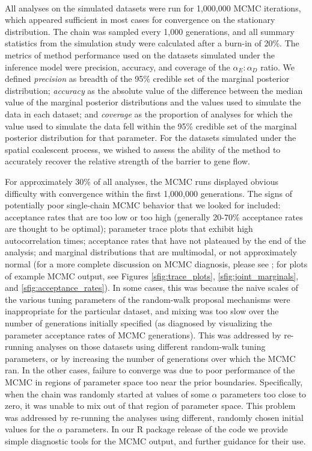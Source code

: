 \paragraph{}
All analyses on the simulated datasets were run for 1,000,000 MCMC iterations, which appeared sufficient in most cases for convergence on the stationary distribution.  The chain was sampled every 1,000 generations, and all summary statistics from the simulation study were calculated after a burn-in of 20\%.  The metrics of method performance used on the datasets simulated under the inference model were precision, accuracy, and coverage of the $\alpha_{E}:\alpha_{D}$ ratio.  We defined \emph{precision} as breadth of the 95\% credible set of the marginal posterior distribution; \emph{accuracy} as the absolute value of the difference between the median value of the marginal posterior distributions and the values used to simulate the data in each dataset; and \emph{coverage} as the proportion of analyses for which the value used to simulate the data fell within the 95\% credible set of the marginal posterior distribution for that parameter.  For the datasets simulated under the spatial coalescent process, we wished to assess the ability of the method to accurately recover the relative strength of the barrier to gene flow.

For approximately 30\% of all analyses, the MCMC runs displayed obvious difficulty with convergence within the first 1,000,000 generations.  The signs of potentially poor single-chain MCMC behavior that we looked for included: acceptance rates that are too low or too high (generally 20-70\% acceptance rates are thought to be optimal); parameter trace plots that exhibit high autocorrelation times; acceptance rates that have not plateaued by the end of the analysis; and marginal distributions that are multimodal, or not approximately normal (for a more complete discussion on MCMC diagnosis, please see \citet{Gilks1996}; for plots of example MCMC output, see Figures \ref{sfig:trace_plots}, \ref{sfig:joint_marginals}, and \ref{sfig:acceptance_rates}).  In some cases, this was because the naive scales of the various tuning parameters of the random-walk proposal mechanisms were inappropriate for the particular dataset, and mixing was too slow over the number of generations initially specified (as diagnosed by visualizing the parameter acceptance rates of MCMC generations).  This was addressed by re-running analyses on those datasets using different random-walk tuning parameters, or by increasing the number of generations over which the MCMC ran.  In the other cases, failure to converge was due to poor performance of the MCMC in regions of parameter space too near the prior boundaries.  Specifically, when the chain was randomly started at values of some $\alpha$ parameters too close to zero, it was unable to mix out of that region of parameter space.  This problem was addressed by re-running the analyses using different, randomly chosen initial values for the $\alpha$ parameters.  In our R package release of the code we provide simple diagnostic tools for the MCMC output, and further guidance for their use.

